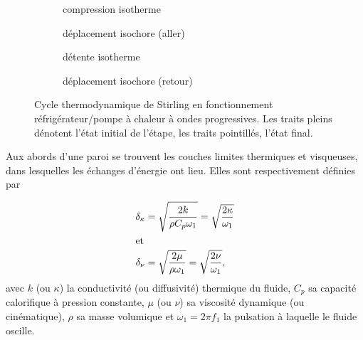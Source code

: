 \begin{figure}[!ht]
	\centering
	\begin{subfigure}{.47\textwidth}
		\centering
		
		\caption{compression isotherme}
		\label{fig:CycleStirling_Comp}
	\end{subfigure}
	\begin{subfigure}{.47\textwidth}
		\centering
		
		\caption{déplacement isochore (aller)}
		\label{fig:CycleStirling_DepIsoch1}
	\end{subfigure}
	
	\vspace{5mm}
	\begin{subfigure}{.47\textwidth}
		\centering
		
		\caption{détente isotherme}
		\label{fig:CycleStirling_Detente}
	\end{subfigure}
	\begin{subfigure}{.47\textwidth}
		\centering
		
		\caption{déplacement isochore (retour)}
		\label{fig:CycleStirling_DepIsoch2}
	\end{subfigure}	
	\caption[Cycle de Stirling des machines à ondes progressives]{Cycle thermodynamique de Stirling en fonctionnement réfrigérateur/pompe à chaleur à ondes progressives. Les traits pleins dénotent l'état initial de l'étape, les traits pointillés, l'état final.}
	\label{fig:CycleStirling}
\end{figure} %



Aux abords d'une paroi se trouvent les couches limites thermiques et visqueuses, dans lesquelles les échanges d'énergie ont lieu. Elles sont respectivement définies par

\begin{subequations}
	\begin{align}
		\delta_{\kappa} &= \sqrt{\frac{2 k}{\rho C_p \omega_1}} = \sqrt{\frac{2 \kappa}{\omega_1}}	\label{eq:CouchesLimites_Thermique}\\
		\intertext{et}
		\delta_{\nu} &= \sqrt{\frac{2 \mu}{\rho \omega_1}} = \sqrt{\frac{2 \nu}{\omega_1}},	\label{eq:CouchesLimites_Visqueuse}
	\end{align}
	\label{eq:CouchesLimites}%
\end{subequations}
avec $k$ (ou $\kappa$) la conductivité (ou diffusivité) thermique du fluide, $C_p$ sa capacité calorifique à pression constante, $\mu$ (ou $\nu$) sa viscosité dynamique (ou cinématique), $\rho$ sa masse volumique et $\omega_1 = 2\pi f_1$ la pulsation à laquelle le fluide oscille.

